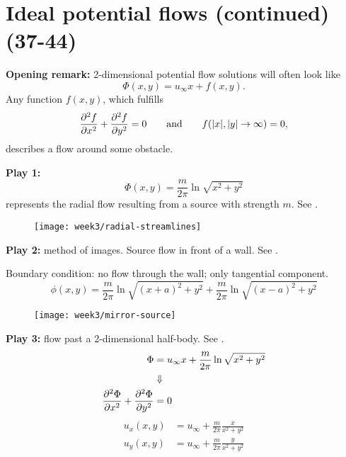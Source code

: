 \section{Ideal potential flows (continued) (37-44)}

\begin{framed}
\textbf{Opening remark:} 2-dimensional potential flow solutions will often look like
\begin{equation}
\Phi(x,y) = u_\infty x + f(x,y).
\end{equation}
Any function $f(x,y)$, which fulfills
\begin{equation}
\frac{\partial^2 f}{\partial x^2}+\frac{\partial^2 f}{\partial y^2}=0 \qquad \mathrm{and}\qquad f(|x|,|y|\rightarrow\infty) = 0,
\end{equation}
describes a flow around some obstacle.
\end{framed}


\textbf{Play 1:}
\begin{equation}
\Phi(x,y)=\frac{m}{2\pi} \ln \sqrt{x^2+y^2}
\end{equation}
represents the radial flow resulting from a source with strength $m$. See .
\begin{figure}[!h]
    \centering
    \texttt{[image: week3/radial-streamlines]}\\
    \caption{}
    \label{fig:radial-streamlines}
\end{figure}

\textbf{Play 2:} method of images. Source flow in front of a wall. See .

Boundary condition: no flow through the wall; only tangential component.
\begin{equation}
\phi(x,y) = \frac{m}{2\pi}\ln\sqrt{(x+a)^2+y^2} + \frac{m}{2\pi}\ln\sqrt{(x-a)^2+y^2}
\end{equation}
\begin{figure}[!h]
    \centering
    \texttt{[image: week3/mirror-source]}\\
    \caption{}
    \label{fig:mirror-source}
\end{figure}

\textbf{Play 3:} flow past a 2-dimensional half-body. See .
\begin{align}
\Phi &= u_\infty x + \frac{m}{2\pi}\ln\sqrt{x^2+y^2}\\
&\Downarrow\notag\\
\frac{\partial^2 \Phi}{\partial x^2}+\frac{\partial^2 \Phi}{\partial y^2} &= 0
\end{align}
\begin{align}
u_x(x,y) &= u_\infty + \frac{m}{2\pi}\frac{x}{x^2+y^2}\\
u_y(x,y) &= u_\infty + \frac{m}{2\pi}\frac{y}{x^2+y^2}
\end{align}

